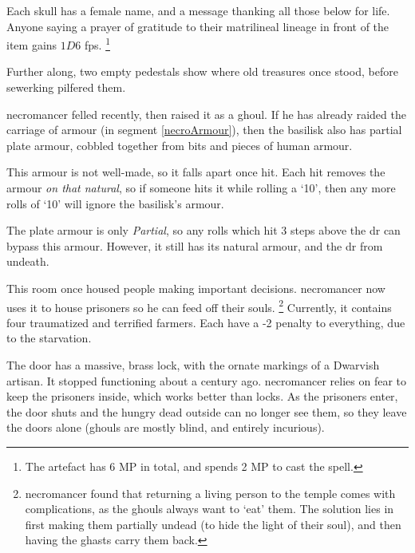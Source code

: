 \begin{multicols}{2}
Each skull has a female name, and a message thanking all those below for life.
Anyone saying a prayer of gratitude to their matrilineal lineage in front of the item gains $1D6$ \glspl{fp}.%
\footnote{The \gls{artefact} has 6 MP in total, and spends 2 MP to cast the spell.}

Further along, two empty pedestals show where old treasures once stood, before \gls{sewerking} pilfered them.%


\Gls{necromancer} felled  recently, then raised it as a ghoul.
If he has already raided the carriage of armour (in \gls{segment} \vref{necroArmour}), then the \gls{basilisk} also has partial plate armour, cobbled together from bits and pieces of human armour.

This armour is not well-made, so it falls apart once hit.
Each hit removes the armour \textit{on that \gls{natural}}, so if someone hits it while rolling a `10', then any more rolls of `10' will ignore the \gls{basilisk}'s armour.

The plate armour is only \textit{Partial}, so any rolls which hit 3 steps above the \gls{dr} can bypass this armour.
However, it still has its natural armour, and the \gls{dr} from undeath.%

\undeadBasilisk


This room once housed people making important decisions.
\Gls{necromancer} now uses it to house prisoners so he can feed off their souls.%
\footnote{\Gls{necromancer} found that returning a living person to the temple comes with complications, as the ghouls always want to `eat' them.
The solution lies in first making them partially undead (to hide the light of their soul), and then having the ghasts carry them back.}
Currently, it contains four traumatized and terrified farmers.
Each have a -2 penalty to everything, due to the starvation.

The door has a massive, brass lock, with the ornate markings of a Dwarvish artisan.
It stopped functioning about a century ago.
\Gls{necromancer} relies on fear to keep the prisoners inside, which works better than locks.
As the prisoners enter, the door shuts and the hungry dead outside can no longer see them, so they leave the doors alone (ghouls are mostly blind, and entirely incurious).


\end{multicols}
